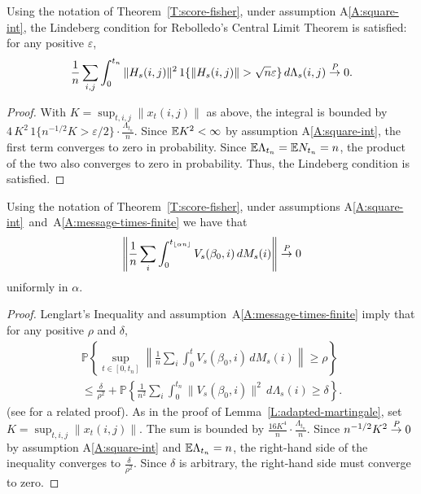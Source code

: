 \documentclass[final]{statsoc}
\begin{document}
\begin{lemma}\label{L:Lindeberg-condition}
Using the notation of Theorem~\ref{T:score-fisher}, under assumption
A\ref{A:square-int}, the Lindeberg condition for Rebolledo's \citeyearpar{rebolledo1980central} Central Limit
Theorem is satisfied: for any positive $\varepsilon$,
\[
    \frac{1}{n}
    \sum_{i,j}
    \int_{0}^{t_n}
        \| H_s(i,j) \|^2
        \, 1\{\| H_s(i,j) \| > \sqrt{n} \varepsilon \}
        \, d\Lambda_s(i,j)
        \overset{\mathit{P}}{\to}
        0.
\]
\end{lemma}

\begin{proof}
With $K = \sup_{t,i,j} \| x_t(i,j)\|$ as above, the integral is bounded by
\(
    4 \, K^2 \, 1\{n^{-1/2} K > \varepsilon / 2\}
    \cdot
    \frac{\Lambda_{t_n}}{n}.
\)
Since $\mathbb{E} K^2 < \infty$ by assumption A\ref{A:square-int}, the first term
converges to zero in probability.  Since
$\mathbb{E} \Lambda_{t_n} = \mathbb{E} N_{t_n} = n$, the product of the two also
converges to zero in probability.  Thus, the Lindeberg condition is satisfied.
\end{proof}


\begin{lemma}\label{L:Lenglart}
Using the notation of Theorem~\ref{T:score-fisher}, under assumptions
A\ref{A:square-int}~and~A\ref{A:message-times-finite} we have that
\[
    \left\|
            \frac{1}{n}
            \sum_i
            \int_0^{t_{\lfloor \alpha n \rfloor}}
                V_s(\beta_0, i) \, dM_s(i)
    \right\|
        \overset{\mathit{P}}{\to} 0
\]
uniformly in $\alpha$.
\end{lemma}

\begin{proof}
Lenglart's \citeyearpar{lenglart1977relation} Inequality and assumption~A\ref{A:message-times-finite} imply that
for any positive $\rho$ and $\delta$,
\begin{multline*}
    \mathbb{P}\left\{
        \sup_{t \in [0,t_n]}
        \left\|
            \frac{1}{n}
            \sum_{i}
            \int_{0}^{t}
                V_s(\beta_0, i) \, dM_s(i)
        \right\|
        \geq \rho
    \right\} \\
    \leq
    \frac{\delta}{\rho^2}
    +
    \mathbb{P}\left\{
        \frac{1}{n^2}
        \sum_{i}
        \int_{0}^{t_n}
            \| V_s (\beta_0, i) \|^2
            \, d\Lambda_s(i)
        \geq
        \delta
    \right\}.
\end{multline*}
(see \citet[Cor.~3.4.1]{fleming1991counting} for a related proof).  As in the proof of
Lemma~\ref{L:adapted-martingale}, set $K = \sup_{t,i,j} \| x_t(i,j) \|$.
The sum is bounded by $\frac{16 K^4}{n} \cdot \frac{\Lambda_{t_n}}{n}$.
Since $n^{-1/2} K^2 \overset{\mathit{P}}{\to} 0$ by assumption A\ref{A:square-int} and
$\mathbb{E} \Lambda_{t_n} = n$, the right-hand side of the inequality converges to
$\frac{\delta}{\rho^2}$.  Since $\delta$ is arbitrary, the right-hand side
must converge to zero.
\end{proof}
\end{document}
